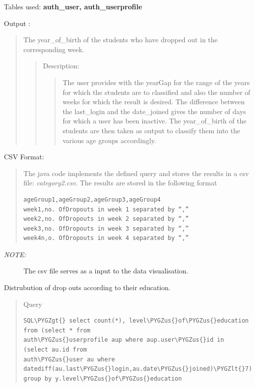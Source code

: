 \documentclass[a4paper,12pt,oneside]{sphinxmanual}
\def\PYGZus{\char`\_}
\def\PYGZlt{\char`\<}
\def\PYGZgt{\char`\>}
\begin{document}
\begin{itemize}
\begin{description}
Tables used: \textbf{auth\_user, auth\_userprofile}

Output :
\begin{quote}

The year\_of\_birth of the students who have dropped out in the corresponding week.
\begin{quote}

Description:
\begin{quote}

The user provides with the yearGap for the range of the years for which the students are to classified and also the number of weeks for which the result is desired.
The difference between the last\_login and the date\_joined gives the number of days for which a user has been inactive.
The year\_of\_birth of the students are then taken as output to classify them into the various age groups accordingly.
\end{quote}
\end{quote}
\end{quote}

CSV Format:
\begin{quote}

The java code implements the defined query and stores the results in a csv file: \emph{category2.csv}.
The results are stored in the following format

\begin{Verbatim}[commandchars=\\\{\}]
ageGroup1,ageGroup2,ageGroup3,ageGroup4
week1,no. OfDropouts in week 1 separated by “,”
week2,no. OfDropouts in week 2 separated by “,”
week3,no. OfDropouts in week 3 separated by “,”
week4n,o. OfDropouts in week 4 separated by “,”
\end{Verbatim}
\end{quote}
\begin{description}
\item[{\emph{NOTE:}}] \leavevmode
The csv file serves as a input to the data visualisation.

\end{description}

\end{description}

Distrubution of drop outs according to their education.
\begin{quote}

Query

\begin{Verbatim}[commandchars=\\\{\}]
SQL\PYGZgt{} select count(*), level\PYGZus{}of\PYGZus{}education from (select * from
auth\PYGZus{}userprofile aup where aup.user\PYGZus{}id in (select au.id from
auth\PYGZus{}user au where datediff(au.last\PYGZus{}login,au.date\PYGZus{}joined)\PYGZlt{}7))y
group by y.level\PYGZus{}of\PYGZus{}education
\end{Verbatim}


\end{quote}
\end{itemize}
\end{document}
